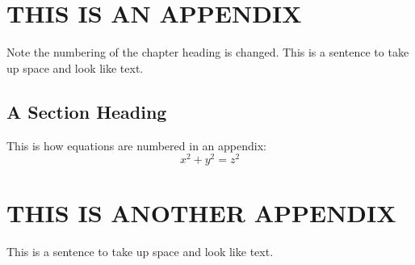 \documentclass{thesis}
\begin{document}
\appendix    %
\chapter{THIS IS AN APPENDIX}
Note the numbering of the chapter heading is changed.
This is a sentence to take up space and look like text.
\section{A Section Heading}
This is how equations are numbered in an appendix:
\begin{equation}
x^2 + y^2 = z^2
\end{equation} 

\chapter{THIS IS ANOTHER APPENDIX}
This is a sentence to take up space and look like text.
\end{document}
